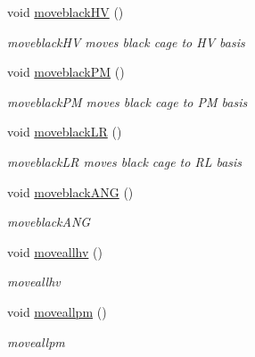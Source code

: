\begin{DoxyCompactItemize}
void \hyperlink{classcagecontrol_a432cbc27c9981b81c218163f26972daa}{moveblack\+HV} ()
\begin{DoxyCompactList}\small\item\em moveblack\+HV moves black cage to HV basis \end{DoxyCompactList}\item 
\mbox{\label{classcagecontrol_a42a9180358270c4b5a2e3bf8fe8dd016}} 
void \hyperlink{classcagecontrol_a42a9180358270c4b5a2e3bf8fe8dd016}{moveblack\+PM} ()
\begin{DoxyCompactList}\small\item\em moveblack\+PM moves black cage to PM basis \end{DoxyCompactList}\item 
\mbox{\label{classcagecontrol_a776a75fb1b9b680a0e99f5332446d616}} 
void \hyperlink{classcagecontrol_a776a75fb1b9b680a0e99f5332446d616}{moveblack\+LR} ()
\begin{DoxyCompactList}\small\item\em moveblack\+LR moves black cage to RL basis \end{DoxyCompactList}\item 
\mbox{\label{classcagecontrol_ae1ded3bab80cf942c1662b371b4aa9ce}} 
void \hyperlink{classcagecontrol_ae1ded3bab80cf942c1662b371b4aa9ce}{moveblack\+A\+NG} ()
\begin{DoxyCompactList}\small\item\em moveblack\+A\+NG \end{DoxyCompactList}\item 
\mbox{\label{classcagecontrol_a79f7b716a9b1a49ade6dd35879af6947}} 
void \hyperlink{classcagecontrol_a79f7b716a9b1a49ade6dd35879af6947}{moveallhv} ()
\begin{DoxyCompactList}\small\item\em moveallhv \end{DoxyCompactList}\item 
\mbox{\label{classcagecontrol_aa3f9b4e3937ffc7eca65edac02d5d4db}} 
void \hyperlink{classcagecontrol_aa3f9b4e3937ffc7eca65edac02d5d4db}{moveallpm} ()
\begin{DoxyCompactList}\small\item\em moveallpm \end{DoxyCompactList}\item 

\end{DoxyCompactItemize}
